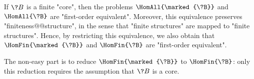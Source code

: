 \begin{proposition}[Folklore]
	\!%
	\AP\label{prop:idempotent-core-preserves-csp-complexity}
	If $\?B$ is a finite "core", then the problems $\HomAll{\marked{\?B}}$ and 
	$\HomAll{\?B}$ are "first-order equivalent".
	Moreover, this equivalence preserves "finiteness@@structure",
	in the sense that "finite structures" are mapped to "finite structures".  
	Hence, by restricting this equivalence, we also obtain that
	$\HomFin{\marked{\?B}}$ and $\HomFin{\?B}$ are "first-order equivalent".
\end{proposition}

The non-easy part is to reduce $\HomFin{\marked{\?B}}$ to $\HomFin{\?B}$: only this reduction
requires the assumption that $\?B$ is a core.

